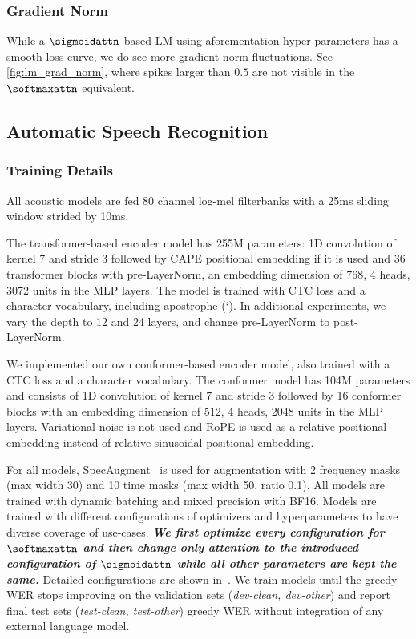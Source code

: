 \subsubsection{Gradient Norm}
While a $\sigmoidattn$ based LM using aforementation hyper-parameters has a smooth loss curve, we do see more gradient norm fluctuations. See \cref{fig:lm_grad_norm}, where spikes larger than $0.5$ are not visible in the $\softmaxattn$ equivalent.

\subsection{Automatic Speech Recognition}
\label{sec:asr_hps}

\subsubsection{Training Details}
All acoustic models are fed 80 channel log-mel filterbanks with a 25ms sliding window strided by 10ms. 

The transformer-based encoder model has 255M parameters: 1D convolution of kernel 7 and stride 3 followed by CAPE positional embedding if it is used and 36 transformer blocks with pre-LayerNorm, an embedding dimension of 768, 4 heads, 3072 units in the MLP layers.
The model is trained with CTC loss and a character vocabulary, including apostrophe (`). 
In additional experiments, we vary the depth to 12 and 24 layers, and change pre-LayerNorm to post-LayerNorm.

We implemented our own conformer-based encoder model, also trained  with a CTC loss and a character vocabulary.
The conformer model has 104M parameters and consists of 1D convolution of kernel 7 and stride 3 followed by 16 conformer blocks with an embedding dimension of 512, 4 heads, 2048 units in the MLP layers. 
Variational noise is not used and RoPE is used as a relative positional embedding instead of relative sinusoidal positional embedding.

For all models, SpecAugment~\citep{DBLP:conf/interspeech/ParkCZCZCL19} is used for augmentation with 2 frequency masks (max width 30) and 10 time masks (max width 50, ratio 0.1). 
All models are trained with dynamic batching and mixed precision with BF16.
Models are trained with different configurations of optimizers and hyperparameters to have diverse coverage of use-cases. 
\textbf{\textit{We first optimize every configuration for $\softmaxattn$ and then change only attention to the introduced configuration of $\sigmoidattn$ while all other parameters are kept the same.}}
Detailed configurations are shown in~.
We train models until the greedy WER stops improving on the validation sets (\textit{dev-clean, dev-other}) and report final test sets (\textit{test-clean, test-other}) greedy WER without integration of any external language model.

